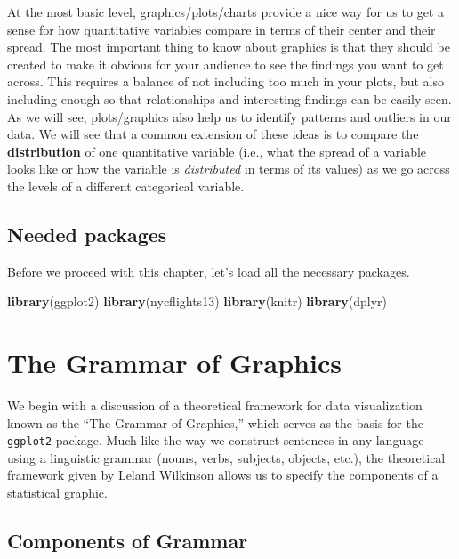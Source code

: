 \documentclass[]{tufte-book}
\newenvironment{Shaded}{\begin{snugshade}}{\end{snugshade}}
\newcommand{\KeywordTok}[1]{\textcolor[rgb]{0.13,0.29,0.53}{\textbf{{#1}}}}
\newcommand{\NormalTok}[1]{{#1}}
\theoremstyle{definition}
\theoremstyle{definition}
\theoremstyle{remark}
\begin{document}
At the most basic level, graphics/plots/charts provide a nice way for us
to get a sense for how quantitative variables compare in terms of their
center and their spread. The most important thing to know about graphics
is that they should be created to make it obvious for your audience to
see the findings you want to get across. This requires a balance of not
including too much in your plots, but also including enough so that
relationships and interesting findings can be easily seen. As we will
see, plots/graphics also help us to identify patterns and outliers in
our data. We will see that a common extension of these ideas is to
compare the \textbf{distribution} of one quantitative variable (i.e.,
what the spread of a variable looks like or how the variable is
\emph{distributed} in terms of its values) as we go across the levels of
a different categorical variable.

\subsection*{Needed packages}\label{needed-packages-1}

Before we proceed with this chapter, let's load all the necessary
packages.

\begin{Shaded}
\begin{Highlighting}[]
\KeywordTok{library}\NormalTok{(ggplot2)}
\KeywordTok{library}\NormalTok{(nycflights13)}
\KeywordTok{library}\NormalTok{(knitr)}
\KeywordTok{library}\NormalTok{(dplyr)}
\end{Highlighting}
\end{Shaded}

\section{The Grammar of Graphics}\label{grammarofgraphics}

We begin with a discussion of a theoretical framework for data
visualization known as the ``The Grammar of Graphics,'' which serves as
the basis for the \texttt{ggplot2} package. Much like the way we
construct sentences in any language using a linguistic grammar (nouns,
verbs, subjects, objects, etc.), the theoretical framework given by
Leland Wilkinson \citep{wilkinson2005} allows us to specify the
components of a statistical graphic.

\subsection{Components of Grammar}\label{components-of-grammar}
\end{document}
